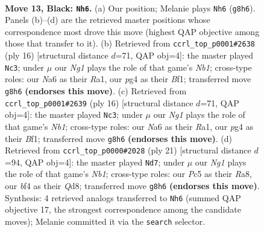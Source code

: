 \documentclass[11pt]{article}
\begin{document}
\clearpage

\begin{figure}[p]\centering
\begin{subfigure}{0.46\textwidth}\centering
\resizebox{\linewidth}{!}{%
\newchessgame
\chessboard[
  setfen={r2q1bnr/3p1k1p/n4pp1/2pP4/P3PBPP/2N5/1P6/R2QK1NR b KQ - 0 13},
  showmover=false,
  pgfstyle=straightmove, color=movearrow, markmove={g8-h6}
]}
\caption{}
\end{subfigure}\hfill
\begin{subfigure}{0.46\textwidth}\centering
\resizebox{\linewidth}{!}{%
\newchessgame
\chessboard[
  setfen={r1b1k1nr/pp2qppp/2np4/8/2P1p3/4P1P1/PP1Q1P1P/RN2KBNR w KQkq - 0 9},
  showmover=false,
  pgfstyle=straightmove, color=movearrow, markmove={b1-c3}
]}
\caption{}
\end{subfigure}
\\[4pt]
\begin{subfigure}{0.46\textwidth}\centering
\resizebox{\linewidth}{!}{%
\newchessgame
\chessboard[
  setfen={r1b1k1nr/pp2qppp/2np4/8/2P1p3/4P1P1/PP1Q1P1P/RN2KBNR w KQkq - 0 9},
  showmover=false,
  pgfstyle=straightmove, color=movearrow, markmove={b1-c3}
]}
\caption{}
\end{subfigure}\hfill
\begin{subfigure}{0.46\textwidth}\centering
\resizebox{\linewidth}{!}{%
\newchessgame
\chessboard[
  setfen={rn1q1rk1/p4ppp/1p1pp3/3b4/3P4/P2BPN2/1P3PPP/R2QK2R b KQ - 1 11},
  showmover=false,
  pgfstyle=straightmove, color=movearrow, markmove={b8-d7}
]}
\caption{}
\end{subfigure}
\caption{\textbf{Move 13, Black: \texttt{Nh6}.} (a) Our position; Melanie plays \texttt{Nh6} (\texttt{g8h6}). Panels (b)--(d) are the retrieved master positions whose correspondence most drove this move (highest QAP objective among those that transfer to it). (b) Retrieved from \texttt{ccrl\_top\_p0001\#2638} (ply 16) [structural distance $d$=71, QAP obj=4]: the master played \texttt{Nc3}; under $\mu$ our \emph{Ng1} plays the role of that game's \emph{Nb1}; cross-type roles: our \emph{N}a6 as their \emph{R}a1, our \emph{p}g4 as their \emph{B}f1; transferred move \texttt{g8h6} \textbf{(endorses this move)}. (c) Retrieved from \texttt{ccrl\_top\_p0001\#2639} (ply 16) [structural distance $d$=71, QAP obj=4]: the master played \texttt{Nc3}; under $\mu$ our \emph{Ng1} plays the role of that game's \emph{Nb1}; cross-type roles: our \emph{N}a6 as their \emph{R}a1, our \emph{p}g4 as their \emph{B}f1; transferred move \texttt{g8h6} \textbf{(endorses this move)}. (d) Retrieved from \texttt{ccrl\_top\_p0000\#2028} (ply 21) [structural distance $d$=94, QAP obj=4]: the master played \texttt{Nd7}; under $\mu$ our \emph{Ng1} plays the role of that game's \emph{Nb1}; cross-type roles: our \emph{P}c5 as their \emph{R}a8, our \emph{b}f4 as their \emph{Q}d8; transferred move \texttt{g8h6} \textbf{(endorses this move)}. Synthesis: 4 retrieved analogs transferred to \texttt{Nh6} (summed QAP objective 17, the strongest correspondence among the candidate moves); Melanie committed it via the \texttt{search} selector.}
\label{fig:thought-m25}
\end{figure}
\end{document}
